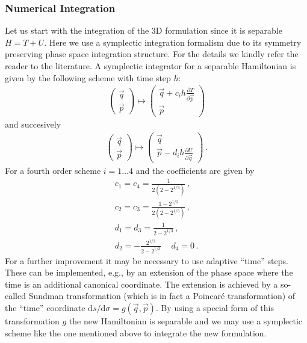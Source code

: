 \documentclass[12pt,a4paper,twoside,openright,BCOR10mm,headsepline,titlepage,abstracton,chapterprefix,final]{scrreprt}
\begin{document}
\subsubsection{Numerical Integration}
Let us start with the integration of the 3D formulation since it is separable $H = T + U$. Here we use a symplectic integration formalism
due to its symmetry preserving phase space integration structure. For the details we kindly refer the reader to the
literature. A symplectic integrator for a separable Hamiltonian is given by the following scheme with time step $h$:
\begin{align}
 \begin{pmatrix}
  \vec{q} \\
  \vec{p}
 \end{pmatrix} \mapsto
 \begin{pmatrix}
  \vec{q} + c_i h \frac{\partial T}{\partial \vec{p}} \\
  \vec{p}
 \end{pmatrix}
\end{align}
and succesively
\begin{align}
 \begin{pmatrix}
  \vec{q} \\
  \vec{p}
 \end{pmatrix} \mapsto
 \begin{pmatrix}
  \vec{q} \\
  \vec{p} - d_i h \frac{\partial U}{\partial \vec{q}}
 \end{pmatrix}\,.
\end{align}
For a fourth order scheme $i=1\dots4$ and the coefficients are given by
\begin{align}
 c_1 = c_4 = \frac{1}{2(2 - 2^{1/3})}\,,\\
 c_2 = c_3 = \frac{1 - 2^{1/3}}{2(2 - 2^{1/3})}\,,\\
 d_1 = d_3 = \frac{1}{2 - 2^{1/3}}\,,\\
 d_2 = -\frac{2^{1/3}}{2 - 2^{1/3}}\,\quad d_4 = 0\,.
\end{align}
For a further improvement it may be necessary to use adaptive ``time'' steps.
These can be implemented, e.g., by an extension of the phase space where
the time is an additional canonical coordinate. The extension is achieved by
a so-called Sundman transformation (which is in fact a Poincar{\'e} transformation)
of the ``time'' coordinate
$\text{d}s/\text{d}\sigma = g(\vec{q}, \vec{p})$.
By using a special form of this transformation $g$ the new Hamiltonian is separable and we
may use a symplectic scheme like the one mentioned above to integrate the new formulation.
\end{document}
